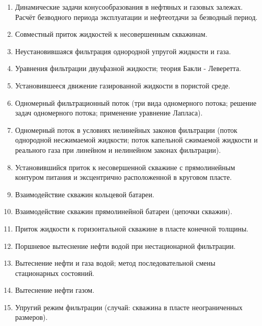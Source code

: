\documentclass[12pt,a4paper]{article}
\begin{document}
\begin{enumerate}
		\item Динамические задачи конусообразования в нефтяных и газовых залежах. Расчёт безводного периода эксплуатации и нефтеотдачи за безводный период.

		\item Совместный приток жидкостей к несовершенным скважинам.

		\item Неустановившаяся фильтрация однородной упругой жидкости и газа.

		\item Уравнения фильтрации двухфазной жидкости; теория Бакли - Леверетта.

		\item Установившееся движение газированной жидкости в пористой среде.

		\item Одномерный фильтрационный поток (три вида одномерного потока; решение задач одномерного потока; применение уравнение Лапласа).

		\item Одномерный поток в условиях нелинейных законов фильтрации (поток однородной несжимаемой жидкости; поток капельной сжимаемой жидкости и реального газа при линейном и нелинейном законах фильтрации).

		\item Установившийся приток к несовершенной скважине с прямолинейным контуром питания и эксцентрично расположенной в круговом пласте.

		\item Взаимодействие скважин кольцевой батареи.

		\item Взаимодействие скважин прямолинейной батареи (цепочки скважин).

		\item Приток жидкости к горизонтальной скважине в пласте конечной толщины.

		\item Поршневое вытеснение нефти водой при нестационарной фильтрации.

		\item Вытеснение нефти и газа водой; метод последовательной смены стационарных состояний.

		\item Вытеснение нефти газом.

		\item Упругий режим фильтрации (случай: скважина в пласте неограниченных размеров).


\end{enumerate}
\end{document}
